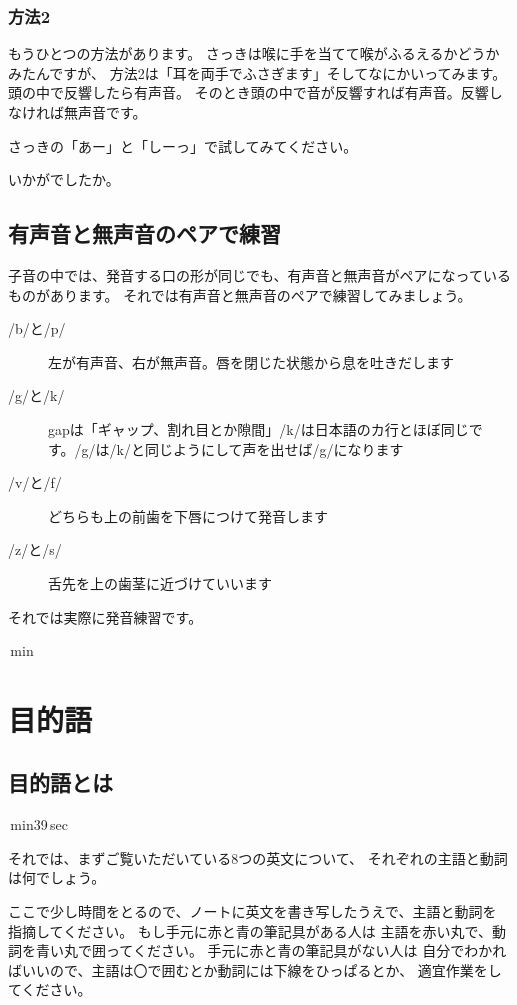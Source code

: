 \documentclass[book,jafontscale=0.9247]{jlreq}
\begin{document}
\subsection{方法2}
もうひとつの方法があります。
さっきは喉に手を当てて喉がふるえるかどうかみたんですが、
方法2は「耳を両手でふさぎます」そしてなにかいってみます。
頭の中で反響したら有声音。
そのとき頭の中で音が反響すれば有声音。反響しなければ無声音です。

さっきの「あー」と「しーっ」で試してみてください。

いかがでしたか。





\section{有声音と無声音のペアで練習}
子音の中では、発音する口の形が同じでも、有声音と無声音がペアになっているものがあります。
それでは有声音と無声音のペアで練習してみましょう。

\begin{description}
 \item[/b/と/p/] 左が有声音、右が無声音。唇を閉じた状態から息を吐きだします
 \item[/g/と/k/] gapは「ギャップ、割れ目とか隙間」/k/は日本語のカ行とほぼ同じです。/g/は/k/と同じようにして声を出せば/g/になります
 \item[/v/と/f/] どちらも上の前歯を下唇につけて発音します
 \item[/z/と/s/] 舌先を上の歯茎に近づけていいます
\end{description}

それでは実際に発音練習です。

\,min

\chapter{目的語}
\section{目的語とは}

\,min39\,sec

それでは、まずご覧いただいている8つの英文について、
それぞれの主語と動詞は何でしょう。

ここで少し時間をとるので、ノートに英文を書き写したうえで、主語と動詞を
指摘してください。
もし手元に赤と青の筆記具がある人は
主語を赤い丸で、動詞を青い丸で囲ってください。
手元に赤と青の筆記具がない人は
自分でわかればいいので、主語は〇で囲むとか動詞には下線をひっぱるとか、
適宜作業をしてください。
\end{document}
